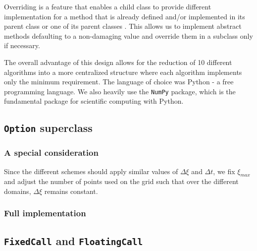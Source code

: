 \documentclass{article}
\begin{document}
Overriding is a feature that enables a child class to provide different implementation for a method that is already defined and/or implemented in its parent class or one of its parent classes \cite{oop_override}. This allows us to implement abstract methods defaulting to a non-damaging value and override them in a subclass only if necessary.

The overall advantage of this design allows for the reduction of 10 different algorithms into a more centralized structure where each algorithm implements only the minimum requirement. The language of choice was Python - a free programming language. We also heavily use the \texttt{NumPy} package, which is the fundamental package for scientific computing with Python.

\subsection{\texttt{Option} superclass}

\subsubsection{A special consideration}
Since the different schemes should apply similar values of \(\Delta\xi\) and \(\Delta t\), we fix \(\xi_{max}\) and adjust the number of points used on the grid such that over the different domains, \(\Delta\xi\) remains constant.

\subsubsection{Full implementation}
\scriptsize

\normalsize

\subsection{\texttt{FixedCall} and \texttt{FloatingCall}}

\scriptsize

\normalsize

\scriptsize

\normalsize
\end{document}
